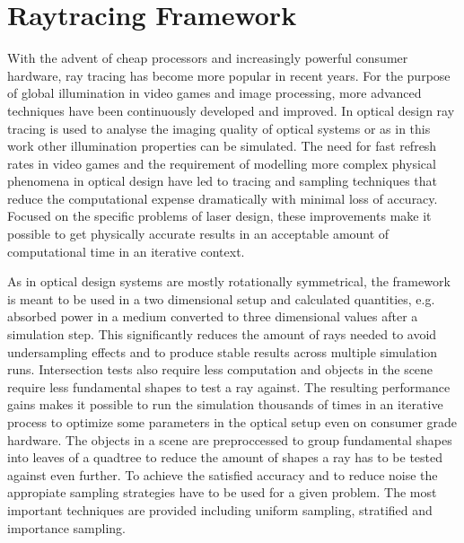 \documentclass[a4paper,10pt]{article}
\begin{document}
    \section{Raytracing Framework}
    With the advent of cheap processors and increasingly powerful 
    consumer hardware, ray tracing has become more popular in
    recent years.
    For the purpose of global illumination in video games and image
    processing, more advanced techniques have been continuously
    developed and improved.
    In optical design ray tracing is used to analyse the imaging 
    quality of optical systems or as in this work other 
    illumination properties can be simulated.
    The need for fast refresh rates in video games and the requirement
    of modelling more complex physical phenomena in optical design
    have led to tracing and sampling techniques that reduce the
    computational expense dramatically with minimal loss of accuracy. 
    Focused on the specific problems of laser design, these
    improvements make it possible to get physically accurate results
    in an acceptable amount of computational time in an iterative
    context.

    As in optical design systems are mostly rotationally symmetrical,
    the framework is meant to be used in a two dimensional setup
    and calculated quantities, e.g. absorbed power in a medium 
    converted to three dimensional values after a simulation step.
    This significantly reduces the amount of rays needed to avoid
    undersampling effects and to produce stable results across multiple
    simulation runs.
    Intersection tests also require less computation and objects in the
    scene require less fundamental shapes to test a ray against.
    The resulting performance gains makes it possible to run the 
    simulation thousands of times in an iterative process to 
    optimize some parameters in the optical setup even on consumer
    grade hardware.
    The objects in a scene are preproccessed to group fundamental shapes
    into leaves of a quadtree to reduce the amount of shapes a ray has
    to be tested against even further.
    To achieve the satisfied accuracy and to reduce noise the appropiate
    sampling strategies have to be used for a given problem.
    The most important techniques are provided including 
    uniform sampling, stratified and importance sampling.
    
\end{document}
